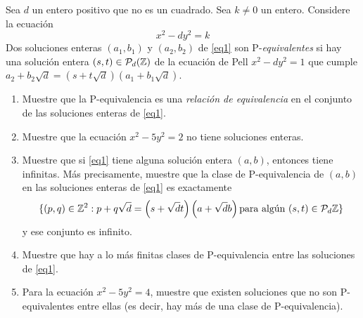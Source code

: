 \begin{prob}[2 pts. c/u]
	Sea $d$ un entero positivo que no es un cuadrado. Sea $k\neq0$ un entero. Considere la ecuación
	\begin{equation}
		x^2-dy^2=k\label{eq1}
	\end{equation}
	Dos soluciones enteras $(a_1,b_1)$ y $(a_2,b_2)$ de \eqref{eq1} son P-\textit{equivalentes} si hay una solución entera $(s,t)\in\mathcal{P}_d(\mathbb{Z})$ de la ecuación de Pell $x^2-dy^2=1$ que cumple $a_2+b_2\sqrt{d}=(s+t\sqrt{d})(a_1+b_1\sqrt{d})$.
	\begin{enumerate}[label = (\roman*)]
		\item Muestre que la P-equivalencia es una \textit{relación de equivalencia} en el conjunto de las soluciones enteras de \eqref{eq1}.

		\item Muestre que la ecuación $x^2-5y^2=2$ no tiene soluciones enteras.

		\item Muestre que si \eqref{eq1} tiene alguna solución entera $(a,b)$, entonces tiene infinitas. Más precisamente, muestre que la clase de P-equivalencia de $(a,b)$ en las soluciones enteras de \eqref{eq1} es exactamente
		      \[
			      \{(p,q)\in\mathbb{Z}^2: p+q\sqrt{d}=\left(s+\sqrt{d}t\right)\left(a+\sqrt{d}b\right)\text{para algún }(s,t)\in\mathcal{P}_d\mathbb{Z}\}
		      \]
		      y ese conjunto es infinito.

		\item Muestre que hay a lo más finitas clases de P-equivalencia entre las soluciones de \eqref{eq1}.

		\item Para la ecuación $x^2-5y^2=4$, muestre que existen soluciones que no son P-equivalentes entre ellas (es decir, hay más de una clase de P-equivalencia).
	\end{enumerate}
\end{prob}

